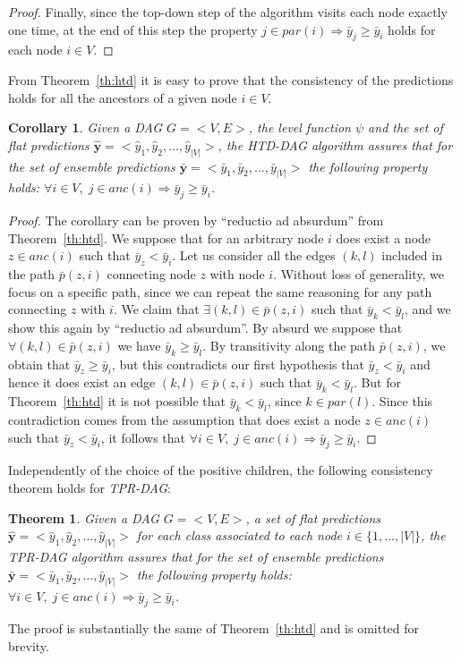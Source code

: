 \documentclass{bioinfo}
\newcommand{\by}{\boldsymbol{y}}
\newtheorem{theorem}{Theorem}
\newtheorem{corollary}{Corollary}
\begin{document}
\begin{proof}
Finally, since the top-down step of the algorithm visits each node exactly one time, at the end of this step the property $j \in par(i) \Rightarrow \bar{y}_j \geq \bar{y}_i$ holds for each node $i\in V$. 
\end{proof}

From Theorem~\ref{th:htd} it is easy to prove that the consistency of the predictions holds for all the ancestors of a given node $i \in V$. 
\begin{corollary}\label{cor:hier-consistency} Given a DAG $G = <V,E>$, the level function $\psi$ and the set of flat predictions $\hat{\by} = < \hat{y}_1, \hat{y}_2, \ldots, \hat{y}_{|V|}>$,  the {\em HTD-DAG} algorithm assures that for the set of ensemble predictions $\bar{\by} = < \bar{y}_1, \bar{y}_2, \ldots, \bar{y}_{|V|}>$ the following property holds: $\forall i \in V, \;  j \in anc(i) \Rightarrow \bar{y}_j \geq \bar{y}_i$.
\end{corollary}
\begin{proof}
The corollary can be proven by ``reductio ad absurdum'' from Theorem~\ref{th:htd}.
We suppose that for an arbitrary node $i$ does exist a node $z \in anc(i)$ such that $\bar{y}_z < \bar{y}_i$.
Let us consider all the edges $(k,l)$ included in the path $\bar{p}(z,i)$ connecting node $z$ with node $i$. Without loss of generality, we focus on a specific path, since we can repeat the same reasoning for any path connecting $z$ with $i$.
We claim that $\exists(k,l) \in \bar{p}(z,i)$ such that $\bar{y}_k < \bar{y}_l$, and we show this again by ``reductio ad absurdum''. 
By absurd we suppose that $\forall (k,l)\in \bar{p}(z,i)$ we have $\bar{y}_k \geq \bar{y}_l$.
By transitivity along the path $\bar{p}(z,i)$, we obtain that $\bar{y}_z \geq \bar{y}_i$, but this contradicts our first hypothesis that $\bar{y}_z < \bar{y}_i$ and hence it does exist an edge $(k,l) \in \bar{p}(z,i)$ such that $\bar{y}_k < \bar{y}_l$. But for Theorem~\ref{th:htd} it is not possible that  $\bar{y}_k < \bar{y}_l$, since $k \in par(l)$.
Since this contradiction comes from the assumption that does exist a node $z \in anc(i)$ such that $\bar{y}_z < \bar{y}_i$, it follows that $\forall i \in V, \;  j \in anc(i) \Rightarrow \bar{y}_j \geq \bar{y}_i$.
\end{proof}


Independently of the choice of the positive children, the following consistency theorem holds for {\em TPR-DAG}:
\begin{theorem} Given a DAG $G = <V,E>$, a set of flat predictions $\hat{\by} = < \hat{y}_1, \hat{y}_2, \ldots, \hat{y}_{|V|}>$ for each class associated to each node $i \in \{1, \ldots, |V| \}$,  the {\em TPR-DAG} algorithm assures that for the set of ensemble predictions $\bar{\by} = < \bar{y}_1, \bar{y}_2, \ldots, \bar{y}_{|V|}>$ the following property holds: $\forall i \in V, \;  j \in anc(i) \Rightarrow \bar{y}_j \geq \bar{y}_i$.
\end{theorem}
The proof is substantially the same of Theorem~\ref{th:htd} and is omitted for brevity. 
\end{document}
